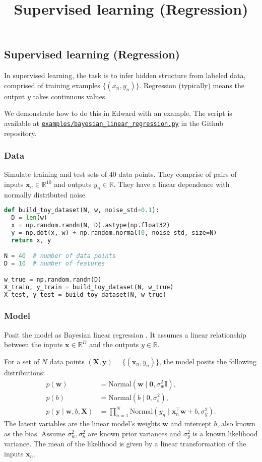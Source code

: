 \title{Supervised learning (Regression)}

\subsection{Supervised learning (Regression)}

In supervised learning, the task is to infer hidden structure from
labeled data, comprised of training examples $\{(x_n, y_n)\}$.
Regression (typically) means the output $y$ takes continuous values.

We demonstrate how to do this in Edward with an example.
The script is available at
\href{https://github.com/blei-lab/edward/blob/master/examples/bayesian_linear_regression.py}
{\texttt{examples/bayesian_linear_regression.py}} in the Github repository.

\subsubsection{Data}

Simulate training and test sets of $40$ data points. They comprise of
pairs of inputs $\mathbf{x}_n\in\mathbb{R}^{10}$ and outputs
$y_n\in\mathbb{R}$. They have a linear dependence with normally
distributed noise.

\begin{lstlisting}[language=Python]
def build_toy_dataset(N, w, noise_std=0.1):
  D = len(w)
  x = np.random.randn(N, D).astype(np.float32)
  y = np.dot(x, w) + np.random.normal(0, noise_std, size=N)
  return x, y

N = 40  # number of data points
D = 10  # number of features

w_true = np.random.randn(D)
X_train, y_train = build_toy_dataset(N, w_true)
X_test, y_test = build_toy_dataset(N, w_true)
\end{lstlisting}


\subsubsection{Model}

Posit the model as Bayesian linear regression \citep{murphy2012machine}.
It assumes a linear relationship between the inputs
$\mathbf{x}\in\mathbb{R}^D$ and the outputs $y\in\mathbb{R}$.

For a set of $N$ data points $(\mathbf{X},\mathbf{y})=\{(\mathbf{x}_n, y_n)\}$,
the model posits the following distributions:
\begin{align*}
  p(\mathbf{w})
  &=
  \text{Normal}(\mathbf{w} \mid \mathbf{0}, \sigma_w^2\mathbf{I}),
  \\[1.5ex]
  p(b)
  &=
  \text{Normal}(b \mid 0, \sigma_b^2),
  \\
  p(\mathbf{y} \mid \mathbf{w}, b, \mathbf{X})
  &=
  \prod_{n=1}^N
  \text{Normal}(y_n \mid \mathbf{x}_n^\top\mathbf{w} + b, \sigma_y^2).
\end{align*}
The latent variables are the linear model's weights $\mathbf{w}$ and
intercept $b$, also known as the bias.
Assume $\sigma_w^2,\sigma_b^2$ are known prior variances and $\sigma_y^2$ is a
known likelihood variance. The mean of the likelihood is given by a
linear transformation of the inputs $\mathbf{x}_n$.

